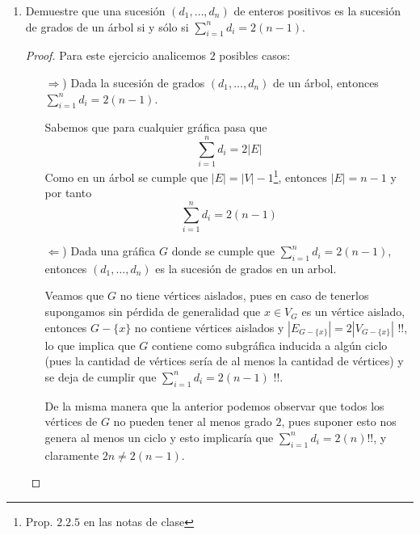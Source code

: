 \documentclass{article}
\begin{document}
\begin{enumerate}
\begin{proof}
      Por lo tanto,  para todo m que pertenece a Naturales sin el cero $C_m H_n$ tal que n=2m+2 
      
      
      \end{proof}



  \item Demuestre que una sucesi\'on $(d_1, \dots,
    d_n)$ de enteros positivos es la sucesi\'on de
    grados de un \'arbol si y s\'olo si
    $\sum_{i=1}^n d_i = 2(n-1)$.
    \renewcommand\qedsymbol{QED}
    \begin{proof}
      Para este ejercicio analicemos $2$ posibles casos:
      \begin{itemize}
      \item[$\Rightarrow$)] Dada la sucesi\'on de grados $(d_1, \dots, d_n)$ de un
        \'arbol, entonces $\sum_{i=1}^n d_i = 2(n-1)$.
        
        Sabemos que para cualquier gr\'afica pasa que
        \[
        \sum_{i=1}^n d_i = 2|E|
        \]
        Como en un \'arbol se cumple que $|E| = |V| - 1$\footnote{Prop. $2.2.5$ en las
          notas de clase}, entonces $|E| = n - 1$ y por tanto
        \[
        \sum_{i=1}^n d_i = 2(n - 1)
        \]
        
      \item[$\Leftarrow$)] Dada una gr\'afica $G$ donde se cumple que
        $\sum_{i=1}^n d_i = 2(n-1)$, entonces $(d_1, \dots, d_n)$ es la
        sucesi\'on de grados en un arbol.
        
        Veamos que $G$ no tiene v\'ertices aislados, pues en caso de tenerlos
        supongamos sin p\'erdida de generalidad que $x \in V_G$ es un
        v\'ertice aislado, entonces $G - \{x\}$ no contiene v\'ertices aislados
        y $|E_{G - \{x\}}| = 2|V_{G - \{x\}}|$ !!, lo que implica que $G$ contiene como
        subgr\'afica inducida a alg\'un ciclo (pues la cantidad de v\'ertices
        ser\'ia de al menos la cantidad de v\'ertices) y se deja de cumplir que
        $\sum_{i=1}^n d_i = 2(n-1)$ !!.
        
        De la misma manera que la anterior podemos observar que todos los v\'ertices
        de $G$ no pueden tener al menos grado $2$, pues suponer esto nos genera
        al menos un ciclo y esto implicar\'ia que $\sum_{i=1}^n d_i = 2(n)$!!, y
        claramente $2n \not= 2(n - 1)$.
        

\end{itemize}
\end{proof}
\end{enumerate}
\end{document}
